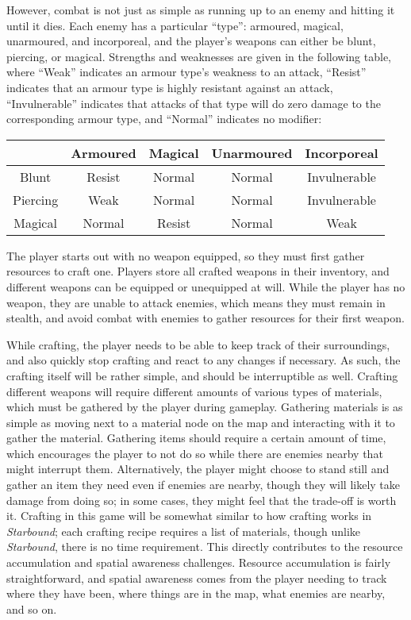 \documentclass[10pt]{article}
\begin{document}
However, combat is not just as simple as running up to an enemy and hitting it until it dies. Each enemy has a particular
``type'': armoured, magical, unarmoured, and incorporeal, and the player's weapons can either be blunt, piercing, or magical.
Strengths and weaknesses are given in the following table, where ``Weak'' indicates an armour type's weakness to an attack,
``Resist'' indicates that an armour type is highly resistant against an attack, ``Invulnerable'' indicates that attacks of
that type will do zero damage to the corresponding armour type, and ``Normal'' indicates no modifier:
\begin{center}
    \begin{tabular}{|c|c|c|c|c|}
        \hline
        & Armoured & Magical & Unarmoured & Incorporeal\\
        \hline
        Blunt & Resist & Normal & Normal & Invulnerable\\
        Piercing & Weak & Normal & Normal & Invulnerable\\
        Magical & Normal & Resist & Normal & Weak\\
        \hline
    \end{tabular}
\end{center}
The player starts out with no weapon equipped, so they must first gather resources to craft one. Players store all
crafted weapons in their inventory, and different weapons can be equipped or unequipped at will.
While the player has no weapon, they are unable to attack enemies, which means they must remain in stealth,
and avoid combat with enemies to gather resources for their first weapon.

While crafting, the player needs to be able to keep track of their surroundings, and also quickly stop crafting
and react to any changes if necessary. As such, the crafting itself will be rather simple, and should be interruptible
as well. Crafting different weapons will require different amounts of various types of materials, which must be gathered
by the player during gameplay. Gathering materials is as simple as moving next to a material node on the map and interacting
with it to gather the material. Gathering items should require a certain amount of time,
which encourages the player to not do so while there are enemies nearby that might interrupt them. Alternatively, the player
might choose to stand still and gather an item they need even if enemies are nearby, though they will likely take damage
from doing so; in some cases, they might feel that the trade-off is worth it. Crafting in this game will be somewhat similar
to how crafting works in \textit{Starbound}; each crafting recipe requires a list of materials, though unlike \textit{Starbound},
there is no time requirement. This directly contributes to the resource accumulation and spatial awareness challenges.
Resource accumulation is fairly straightforward, and spatial awareness comes from the player needing to track where they have been,
where things are in the map, what enemies are nearby, and so on.
\end{document}
